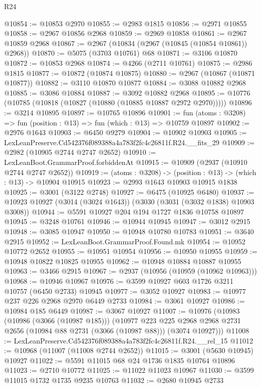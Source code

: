 \begin{lexlean}{R24}
\begin{coremodule}
@10854 := @10853 @2970
@10855 := @2983 @1815
@10856 := @2971 @10855
@10858 := @2967 @10856 @2968
@10859 := @2969 @10858
@10861 := @2967 @10859 @2968
@10867 := @2967 (@10834 (@2967 (@10845 (@10854 @10861)) @2968))
@10870 := @5075 (@3703 @10761) @68
@10871 := @3106 @10870
@10872 := @10853 @2968
@10874 := @4266 (@2711 @10761)
@10875 := @2986 @1815
@10877 := @10872 (@10874 @10875)
@10880 := @2967 (@10867 (@10871 @10877))
@10882 := @3110 @10870 @10877
@10884 := @3088 @10882 @2968
@10885 := @3086 @10884
@10887 := @3092 @10882 @2968
@10895 := @10776 (@10785 (@10818 (@10827 (@10880 (@10885 @10887 @2972 @2970)))))
@10896 := @3214 @10895
@10897 := @10765 @10896
@10901 := fun (atoms : @3208) => fun (position : @13) => fun (which : @13) => @10759 @10897
@10902 := @2976 @1643
@10903 := @6450 @9279
@10904 := @10902 @10903
@10905 := LexLeanPreserve.Cd542376f089388a4a783f2fc4c26811f.R24.__fits_29
@10909 := @2982 (@10905 @2744 @2747 @2652)
@10910 := LexLeanBoot.GrammarProof.forbiddenAt
@10915 := @10909 (@2937 (@10910 @2744 @2747 @2652))
@10919 := (atoms : @3208) -> (position : @13) -> (which : @13) -> @10904 @10915
@10923 := @2993 @1643 @10903 @10915 @1838
@10925 := @3001 (@3122 @2748)
@10927 := @6475 (@10925 @6480)
@10937 := @10923 @10927 (@3014 (@3024 @1643)) (@3030 (@3031 (@3032 @1838) @10903 @3008))
@10944 := @5591 @10927 @204 @194 @1727 @1836 @10758 @10897
@10945 := @3248 @10761
@10946 := @10944 @10945
@10947 := @3012 @2915
@10948 := @3085 @10947
@10950 := @10948 @10780 @10783
@10951 := @3640 @2915
@10952 := LexLeanBoot.GrammarProof.Found.mk
@10954 := @10952 @10772 @2652
@10955 := @10951 @10954
@10956 := @10950 @10955
@10959 := @10948 @10822 @10825 @10955
@10962 := @10948 @10884 @10887 @10955
@10963 := @3466 @2915
@10967 := @2937 (@10956 (@10959 (@10962 @10963)))
@10968 := @10946 @10967
@10976 := @3599 @10927 @603 @1726 @3211 @10757 (@6450 @2733) @10945
@10977 := @3052 @10927
@10983 := @10977 @237 @226 @2968 @2970 @6449 @2733
@10984 := @3061 @10927
@10986 := @10984 @185 @6449
@10987 := @3067 @10927
@11007 := @10976
    (@10983
      (@10986 (@3066 (@10987 @185)))
      (@10977
        @223
        @225
        @2968
        @2968
        @2731
        @2656
        (@10984 @88 @2731 (@3066 (@10987 @88)))
        (@3074 @10927)))
@11008 := LexLeanPreserve.Cd542376f089388a4a783f2fc4c26811f.R24.__rel_15
@11012 := @10968 (@11007 (@11008 @2744 @2652))
@11015 := @3001 (@5630 @10945) @10927
@11022 := @5591 @11015 @68 @24 @1736 @1835 @10764 @10896
@11023 := @2710 @10772
@11025 := @11022 @11023 @10967
@11030 := @3599 @11015 @1732 @1735 @9235 @10763
@11032 := @2680 @10945 @2733

\end{coremodule}
\end{lexlean}
